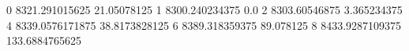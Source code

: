 0 8321.291015625 21.05078125
1 8300.240234375 0.0
2 8303.60546875 3.365234375
4 8339.0576171875 38.8173828125
6 8389.318359375 89.078125
8 8433.9287109375 133.6884765625
